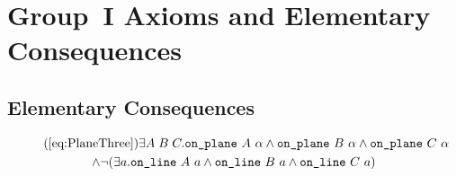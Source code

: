 \chapter{Group~I Axioms and Elementary Consequences}\label{app:group1}

\section{Elementary Consequences}
\begin{multline}
  \tag{\ref{eq:PlaneThree}}
  \exists A\;B\;C. \code{on\_plane}\ A\ \alpha\wedge\code{on\_plane}\ B\ \alpha\wedge\code{on\_plane}\ C\ \alpha\\
  \wedge \Triangle{a}{A}{B}{C}
\end{multline}

